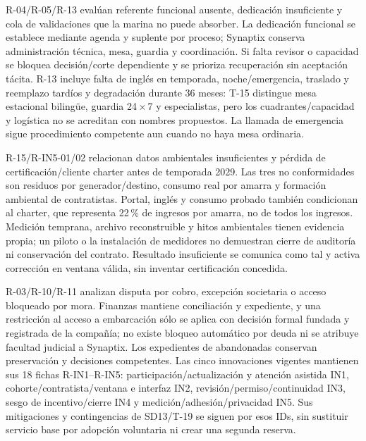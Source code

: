R-04/R-05/R-13 evalúan referente funcional ausente, dedicación insuficiente y cola de validaciones que la marina no puede absorber. La dedicación funcional se establece mediante agenda y suplente por proceso; Synaptix conserva administración técnica, mesa, guardia y coordinación. Si falta revisor o capacidad se bloquea decisión/corte dependiente y se prioriza recuperación sin aceptación tácita. R-13 incluye falta de inglés en temporada, noche/emergencia, traslado y reemplazo tardíos y degradación durante 36 meses: T-15 distingue mesa estacional bilingüe, guardia 24\,$\times$\,7 y especialistas, pero los cuadrantes/capacidad y logística no se acreditan con nombres propuestos. La llamada de emergencia sigue procedimiento competente aun cuando no haya mesa ordinaria.

R-15/R-IN5-01/02 relacionan datos ambientales insuficientes y pérdida de certificación/cliente charter antes de temporada 2029. Las tres no conformidades son residuos por generador/destino, consumo real por amarra y formación ambiental de contratistas. Portal, inglés y consumo probado también condicionan al charter, que representa 22\,\% de ingresos por amarra, no de todos los ingresos. Medición temprana, archivo reconstruible y hitos ambientales tienen evidencia propia; un piloto o la instalación de medidores no demuestran cierre de auditoría ni conservación del contrato. Resultado insuficiente se comunica como tal y activa corrección en ventana válida, sin inventar certificación concedida.

R-03/R-10/R-11 analizan disputa por cobro, excepción societaria o acceso bloqueado por mora. Finanzas mantiene conciliación y expediente, y una restricción al acceso a embarcación sólo se aplica con decisión formal fundada y registrada de la compañía; no existe bloqueo automático por deuda ni se atribuye facultad judicial a Synaptix. Los expedientes de abandonadas conservan preservación y decisiones competentes. Las cinco innovaciones vigentes mantienen sus 18 fichas R-IN1--R-IN5: participación/actualización y atención asistida IN1, cohorte/contratista/ventana e interfaz IN2, revisión/permiso/continuidad IN3, sesgo de incentivo/cierre IN4 y medición/adhesión/privacidad IN5. Sus mitigaciones y contingencias de SD13/T-19 se siguen por esos IDs, sin sustituir servicio base por adopción voluntaria ni crear una segunda reserva. \parencites[arts.~29, 85 y 89; pp.~19--20, 44--45]{sd8-ba}[RT-26.04; p.~44]{sd8-bt}[capítulos 1, 19; decisiones 17/18; restricción 15]{sd8-c07}
